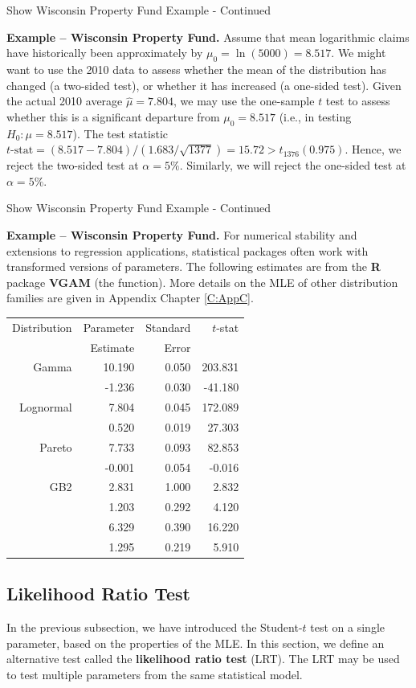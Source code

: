 \documentclass[]{book}
\theoremstyle{definition}
\theoremstyle{definition}
\theoremstyle{definition}
\theoremstyle{remark}
\begin{document}
Show Wisconsin Property Fund Example - Continued

\hypertarget{EXM:S1:TST1}{}
\textbf{Example -- Wisconsin Property Fund.} Assume that mean
logarithmic claims have historically been approximately by
\(\mu_0 = \ln(5000)= 8.517\). We might want to use the 2010 data to
assess whether the mean of the distribution has changed (a two-sided
test), or whether it has increased (a one-sided test). Given the actual
2010 average \(\hat{\mu} =7.804\), we may use the one-sample \(t\) test
to assess whether this is a significant departure from \(\mu_0 = 8.517\)
(i.e., in testing \(H_0:\mu=8.517\)). The test statistic
\(t\text{-stat}=(8.517-7.804)/(1.683/\sqrt{1377}) = 15.72>t_{1376}\left(0.975\right)\).
Hence, we reject the two-sided test at \(\alpha=5\%\). Similarly, we
will reject the one-sided test at \(\alpha=5\%\).

Show Wisconsin Property Fund Example - Continued

\hypertarget{EXM:S1:TST2}{}
\textbf{Example -- Wisconsin Property Fund.} For numerical stability and
extensions to regression applications, statistical packages often work
with transformed versions of parameters. The following estimates are
from the \textbf{R} package \textbf{VGAM} (the function). More details
on the MLE of other distribution families are given in Appendix Chapter
\ref{C:AppC}.

\begin{longtable}[]{@{}rrrr@{}}
\toprule
Distribution & Parameter & Standard & \(t\)-stat\tabularnewline
& Estimate & Error &\tabularnewline
Gamma & 10.190 & 0.050 & 203.831\tabularnewline
& -1.236 & 0.030 & -41.180\tabularnewline
Lognormal & 7.804 & 0.045 & 172.089\tabularnewline
& 0.520 & 0.019 & 27.303\tabularnewline
Pareto & 7.733 & 0.093 & 82.853\tabularnewline
& -0.001 & 0.054 & -0.016\tabularnewline
GB2 & 2.831 & 1.000 & 2.832\tabularnewline
& 1.203 & 0.292 & 4.120\tabularnewline
& 6.329 & 0.390 & 16.220\tabularnewline
& 1.295 & 0.219 & 5.910\tabularnewline
\bottomrule
\end{longtable}

\subsection{Likelihood Ratio Test}\label{S:AppA:HT:LRT}

In the previous subsection, we have introduced the Student-\(t\) test on
a single parameter, based on the properties of the MLE. In this section,
we define an alternative test called the \textbf{likelihood ratio test}
(LRT). The LRT may be used to test multiple parameters from the same
statistical model.
\end{document}
